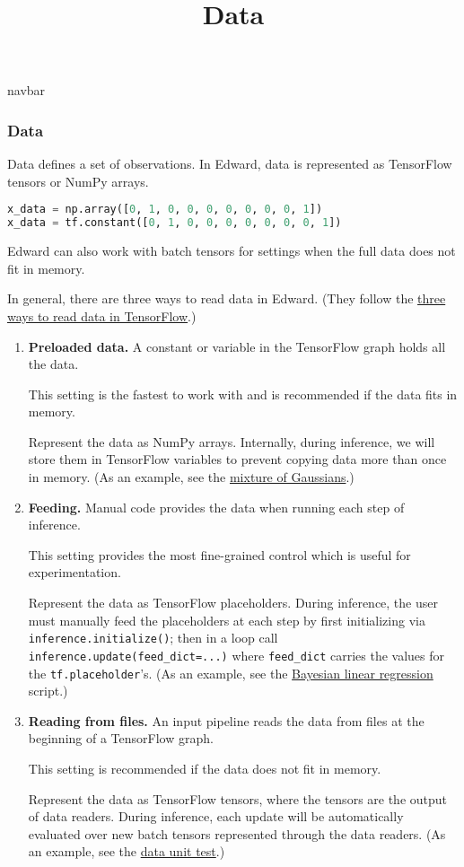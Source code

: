 \title{Data}

{{navbar}}

\subsubsection{Data}

Data defines a set of observations. In Edward, data is represented as
TensorFlow tensors or NumPy arrays.

\begin{lstlisting}[language=Python]
x_data = np.array([0, 1, 0, 0, 0, 0, 0, 0, 0, 1])
x_data = tf.constant([0, 1, 0, 0, 0, 0, 0, 0, 0, 1])
\end{lstlisting}

Edward can also work with batch tensors for settings when the full
data does not fit in memory.

In general, there are three ways to read data in Edward. (They follow
the \href{https://www.tensorflow.org/versions/master/how_tos/reading_data/index.html}
{three ways to read data in TensorFlow}.)

\begin{enumerate}
\item
   \textbf{Preloaded data.} A constant or variable in the TensorFlow graph
   holds all the data.

   This setting is the fastest to work with and is recommended if the
   data fits in memory.

   Represent the data as NumPy arrays.
   Internally, during inference, we will store them in TensorFlow variables to prevent
   copying data more than once in memory.
   (As an example, see
   the
   \href{https://github.com/blei-lab/edward/blob/master/examples/tf_mixture_gaussian.py}
   {mixture of Gaussians}.)
\item
   \textbf{Feeding.} Manual code provides the data when running each step of
   inference.

   This setting provides the most fine-grained control which is useful for experimentation.

   Represent the data as TensorFlow placeholders. During inference,
   the user must manually feed the placeholders at each
   step by first initializing via \texttt{inference.initialize()}; then
   in a loop call \texttt{inference.update(feed_dict={...})} where
   \texttt{feed_dict} carries the values for the \texttt{tf.placeholder}'s.
   (As an example, see
   the
   \href{https://github.com/blei-lab/edward/blob/master/examples/bayesian_linear_regression.py}
   {Bayesian linear regression} script.)
\item
   \textbf{Reading from files.} An input pipeline reads the data from files
   at the beginning of a TensorFlow graph.

   This setting is recommended if the data does not fit in memory.

   Represent the data as TensorFlow tensors, where the tensors are the
   output of data readers. During inference, each update will be
   automatically evaluated over new batch tensors represented through
   the data readers. (As an example, see
   the
   \href{https://github.com/blei-lab/edward/blob/master/tests/test_inference_data.py}
   {data unit test}.)
\end{enumerate}
